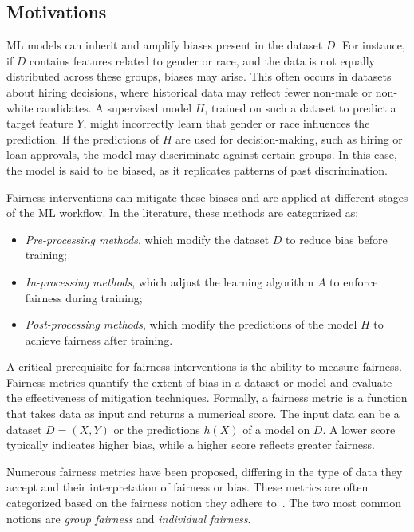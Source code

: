 \subsection{Motivations}\label{subsec:fairness-motivations}
%
\Gls{ML} models can inherit and amplify biases present in the dataset \(D\).
%
For instance, if \(D\) contains features related to gender or race, and the data is not equally distributed across these groups, biases may arise.
%
This often occurs in datasets about hiring decisions, where historical data may reflect fewer non-male or non-white candidates.
%
A supervised model \(H\), trained on such a dataset to predict a target feature \(Y\), might incorrectly learn that gender or race influences the prediction.
%
If the predictions of \(H\) are used for decision-making, such as hiring or loan approvals, the model may discriminate against certain groups.
%
In this case, the model is said to be biased, as it replicates patterns of past discrimination.

%
Fairness interventions can mitigate these biases and are applied at different stages of the \gls{ML} workflow.
%
In the literature, these methods are categorized as:
%
\begin{itemize}
    \item \textit{Pre-processing methods}, which modify the dataset \(D\) to reduce bias before training;
    \item \textit{In-processing methods}, which adjust the learning algorithm \(A\) to enforce fairness during training;
    \item \textit{Post-processing methods}, which modify the predictions of the model \(H\) to achieve fairness after training.
\end{itemize}

%
A critical prerequisite for fairness interventions is the ability to measure fairness.
%
Fairness metrics quantify the extent of bias in a dataset or model and evaluate the effectiveness of mitigation techniques.
%
Formally, a fairness metric is a function that takes data as input and returns a numerical score.
%
The input data can be a dataset \(D = (X, Y)\) or the predictions \(h(X)\) of a model on \(D\).
%
A lower score typically indicates higher bias, while a higher score reflects greater fairness.

%
Numerous fairness metrics have been proposed, differing in the type of data they accept and their interpretation of fairness or bias.
%
These metrics are often categorized based on the fairness notion they adhere to~\cite{mehrabi2022fairness}.
%
The two most common notions are \textit{group fairness} and \textit{individual fairness}.


